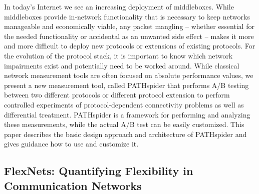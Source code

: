 In today’s Internet we see an increasing deployment of middleboxes. While 
middleboxes provide in-network functionality that is necessary to keep 
networks manageable and economically viable, any packet mangling – whether 
essential for the needed functionality or accidental as an unwanted side 
effect – makes it more and more difficult to deploy new protocols or 
extensions of existing protocols. For the evolution of the protocol stack, 
it is important to know which network impairments exist and potentially 
need to be worked around. While classical network measurement tools are 
often focused on absolute performance values, we present a new measurement 
tool, called PATHspider that performs A/B testing between two different 
protocols or different protocol extension to perform controlled experiments 
of protocol-dependent connectivity problems as well as differential treatment. 
PATHspider is a framework for performing and analyzing these measurements, 
while the actual A/B test can be easily customized. This paper describes the 
basic design approach and architecture of PATHspider and gives guidance how 
to use and customize it.

\subsection{FlexNets: Quantifying Flexibility in Communication Networks}

